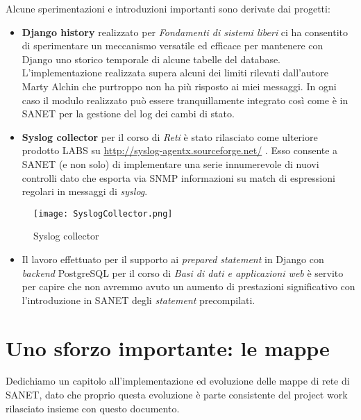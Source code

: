 \documentclass[a4wide,10pt,italian]{manual}
\begin{document}
Alcune sperimentazioni e introduzioni importanti sono derivate dai progetti:
\begin{itemize}
\item {} 
\textbf{Django history} realizzato per \emph{Fondamenti di sistemi liberi} ci ha consentito di sperimentare
un meccanismo versatile ed efficace per mantenere con Django
uno storico temporale di alcune tabelle del database. L'implementazione realizzata supera alcuni
dei limiti rilevati dall'autore Marty Alchin che purtroppo non ha più risposto ai miei messaggi.
In ogni caso il modulo realizzato può essere tranquillamente integrato così come è in SANET
per la gestione del log dei cambi di stato.

\item {} 
\textbf{Syslog collector} per il corso di \emph{Reti} è stato rilasciato come ulteriore prodotto LABS su
\href{http://syslog-agentx.sourceforge.net/}{http://syslog-agentx.sourceforge.net/} .
Esso consente a SANET (e non solo) di implementare una serie innumerevole di nuovi controlli
dato che esporta via SNMP informazioni su match di espressioni regolari in messaggi di \emph{syslog}.

\end{itemize}
\begin{figure}[htbp]
\centering

\texttt{[image: SyslogCollector.png]}
\caption{Syslog collector}\end{figure}
\begin{itemize}
\item {} 
Il lavoro effettuato per il supporto ai \emph{prepared statement} in Django con \emph{backend} PostgreSQL per il
corso di \emph{Basi di dati e applicazioni web} è servito per capire che non avremmo avuto un aumento
di prestazioni significativo con l'introduzione in SANET degli \emph{statement} precompilati.

\end{itemize}

\resetcurrentobjects
\hypertarget{--doc-networkmaps}{}

\chapter{Uno sforzo importante: le mappe}

Dedichiamo un capitolo all'implementazione ed evoluzione delle mappe di rete di SANET,
dato che proprio questa evoluzione è parte consistente del project work rilasciato insieme con questo documento.
\end{document}
